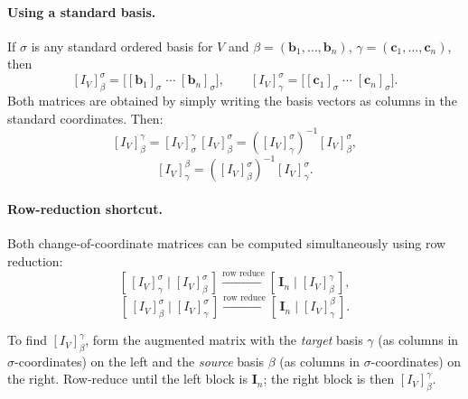 \documentclass[11pt, a4paper, notitlepage]{report}
\theoremstyle{definition}
\theoremstyle{remark}
\begin{document}
\paragraph{Using a standard basis.}
If $\sigma$ is any standard ordered basis for $V$ and $\beta = (\mathbf{b}_1,\ldots,\mathbf{b}_n)$,
$\gamma = (\mathbf{c}_1,\ldots,\mathbf{c}_n)$, then
\[
  [I_V]_\beta^\sigma = \bigl[[\mathbf{b}_1]_\sigma \;\cdots\; [\mathbf{b}_n]_\sigma\bigr],
  \qquad
  [I_V]_\gamma^\sigma = \bigl[[\mathbf{c}_1]_\sigma \;\cdots\; [\mathbf{c}_n]_\sigma\bigr].
\]
Both matrices are obtained by simply writing the basis vectors as columns in the standard
coordinates.  Then:
\[
  [I_V]_\beta^\gamma
  = [I_V]_\sigma^\gamma\,[I_V]_\beta^\sigma
  = \left([I_V]_\gamma^\sigma\right)^{-1} [I_V]_\beta^\sigma,
\]
\[
  [I_V]_\gamma^\beta
  = \left([I_V]_\beta^\sigma\right)^{-1} [I_V]_\gamma^\sigma.
\]

\paragraph{Row-reduction shortcut.}
Both change-of-coordinate matrices can be computed simultaneously using row reduction:
\[
  \left[\,[I_V]_\gamma^\sigma \;\Big|\; [I_V]_\beta^\sigma\,\right]
  \xrightarrow{\text{row reduce}}
  \left[\,\mathbf{I}_n \;\Big|\; [I_V]_\beta^\gamma\,\right],
\]
\[
  \left[\,[I_V]_\beta^\sigma \;\Big|\; [I_V]_\gamma^\sigma\,\right]
  \xrightarrow{\text{row reduce}}
  \left[\,\mathbf{I}_n \;\Big|\; [I_V]_\gamma^\beta\,\right].
\]

\begin{examtip}[title={Exam Tip: Always Put $\sigma$ on the Left}]
To find $[I_V]_\beta^\gamma$, form the augmented matrix with the \emph{target} basis
$\gamma$ (as columns in $\sigma$-coordinates) on the left and the \emph{source} basis
$\beta$ (as columns in $\sigma$-coordinates) on the right.  Row-reduce until the left
block is $\mathbf{I}_n$; the right block is then $[I_V]_\beta^\gamma$.
\end{examtip}
\end{document}
